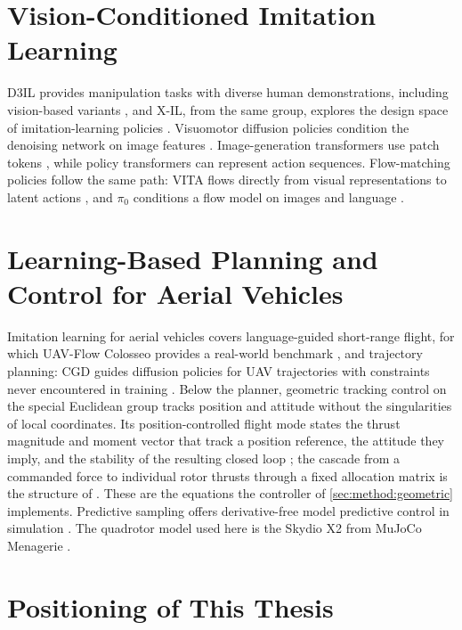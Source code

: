 \documentclass[headsepline,footsepline,footinclude=false,oneside,fontsize=11pt,paper=a4,listof=totoc,bibliography=totoc]{scrbook}
\theoremstyle{definition}
\theoremstyle{plain}
\theoremstyle{remark}
\begin{document}
\section{Vision-Conditioned Imitation Learning}\label{sec:rel:visual}

D3IL provides manipulation tasks with diverse human demonstrations, including vision-based variants
\parencite{jia2024towards}, and X-IL, from the same group, explores the design space of
imitation-learning policies \parencite{jia2025xil}. Visuomotor diffusion policies condition the
denoising network on image features \parencite{chi2023diffusion}. Image-generation transformers use
patch tokens \parencite{peebles2022dit}, while policy transformers can represent action sequences. Flow-matching policies follow the same path: VITA flows
directly from visual representations to latent actions \parencite{gao2025vita}, and $\pi_0$ conditions
a flow model on images and language \parencite{black2024pi0}.

\section{Learning-Based Planning and Control for Aerial Vehicles}\label{sec:rel:aerial}

Imitation learning for aerial vehicles covers language-guided short-range flight, for which UAV-Flow
Colosseo provides a real-world benchmark \parencite{wang2025uavflow}, and trajectory planning: CGD
guides diffusion policies for \ac{UAV} trajectories with constraints never encountered in training
\parencite{kondo2024cgd}. Below the planner, geometric tracking control on the special Euclidean group
tracks position and attitude without the singularities of local coordinates. Its
position-controlled flight mode states the thrust magnitude and moment vector that track a position
reference, the attitude they imply, and the stability of the resulting closed loop
\parencite[Eqs.~(19)--(23), Prop.~3]{lee2010geometric}; the cascade from a commanded force to
individual rotor thrusts through a fixed allocation matrix is the structure of
\parencite{mellinger2011minimum}. These are the equations the controller of
\autoref{sec:method:geometric} implements. Predictive sampling offers derivative-free model
predictive control in simulation \parencite{howell2022predictive}. The quadrotor model used here is the Skydio X2 from MuJoCo
Menagerie \parencite{zakka2022menagerie}.

\section{Positioning of This Thesis}\label{sec:rel:positioning}
\end{document}
